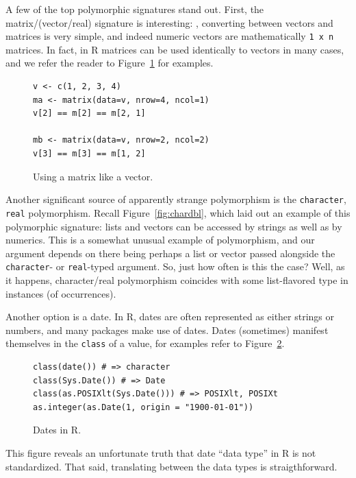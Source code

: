 \documentclass[acmsmall,10pt,review,anonymous]{acmart}\settopmatter{printfolios=true,printccs=false,printacmref=false}
\begin{document}
A few of the top polymorphic signatures stand out.
First, the matrix/(vector/real) signature is interesting: , converting between vectors and matrices is very simple, and indeed numeric vectors are mathematically {\tt 1 x n} matrices.
In fact, in R matrices can be used identically to vectors in many cases, and we refer the reader to Figure~\ref{fig:matasvec} for examples.
\begin{figure}[!hb]{\small\begin{lstlisting}[style=R]
v <- c(1, 2, 3, 4)
ma <- matrix(data=v, nrow=4, ncol=1)
v[2] == m[2] == m[2, 1]

mb <- matrix(data=v, nrow=2, ncol=2)
v[3] == m[3] == m[1, 2] 
\end{lstlisting}}\caption{Using a matrix like a vector.}\label{fig:matasvec}\end{figure}


Another significant source of apparently strange polymorphism is the {\tt character}, {\tt real} polymorphism.
Recall Figure~\ref{fig:chardbl}, which laid out an example of this polymorphic signature: lists and vectors can be accessed by strings as well as by numerics.
This is a somewhat unusual example of polymorphism, and our argument depends on there being perhaps a list or vector passed alongside the {\tt character}- or {\tt real}-typed argument.
So, just how often is this the case?
Well, as it happens, character/real polymorphism coincides with some list-flavored type in \INDEXCOINCIDENCE instances (\INDEXYPERC of occurrences).

Another option is a date.
In R, dates are often represented as either strings or numbers, and many packages make use of dates.
Dates (sometimes) manifest themselves in the {\tt class} of a value, for examples refer to Figure~\ref{fig:date}.
\begin{figure}[!hb]{\small\begin{lstlisting}[style=R]
class(date()) # => character
class(Sys.Date()) # => Date
class(as.POSIXlt(Sys.Date())) # => POSIXlt, POSIXt
as.integer(as.Date(1, origin = "1900-01-01"))
\end{lstlisting}}\caption{Dates in R.}\label{fig:date}\end{figure}

This figure reveals an unfortunate truth that date ``data type'' in R is not standardized.
That said, translating between the data types is straigthforward.
\end{document}
